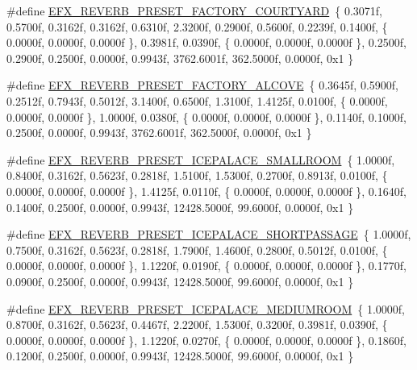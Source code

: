 \begin{DoxyCompactItemize}
\item 
\#define \hyperlink{efx-presets_8h_a687a7fe2f8084947684e61917343ac38}{E\+F\+X\+\_\+\+R\+E\+V\+E\+R\+B\+\_\+\+P\+R\+E\+S\+E\+T\+\_\+\+F\+A\+C\+T\+O\+R\+Y\+\_\+\+C\+O\+U\+R\+T\+Y\+A\+RD}~\{ 0.\+3071f, 0.\+5700f, 0.\+3162f, 0.\+3162f, 0.\+6310f, 2.\+3200f, 0.\+2900f, 0.\+5600f, 0.\+2239f, 0.\+1400f, \{ 0.\+0000f, 0.\+0000f, 0.\+0000f \}, 0.\+3981f, 0.\+0390f, \{ 0.\+0000f, 0.\+0000f, 0.\+0000f \}, 0.\+2500f, 0.\+2900f, 0.\+2500f, 0.\+0000f, 0.\+9943f, 3762.\+6001f, 362.\+5000f, 0.\+0000f, 0x1 \}
\item 
\#define \hyperlink{efx-presets_8h_a20efe3830ae7142d45be73af807e4d04}{E\+F\+X\+\_\+\+R\+E\+V\+E\+R\+B\+\_\+\+P\+R\+E\+S\+E\+T\+\_\+\+F\+A\+C\+T\+O\+R\+Y\+\_\+\+A\+L\+C\+O\+VE}~\{ 0.\+3645f, 0.\+5900f, 0.\+2512f, 0.\+7943f, 0.\+5012f, 3.\+1400f, 0.\+6500f, 1.\+3100f, 1.\+4125f, 0.\+0100f, \{ 0.\+0000f, 0.\+0000f, 0.\+0000f \}, 1.\+0000f, 0.\+0380f, \{ 0.\+0000f, 0.\+0000f, 0.\+0000f \}, 0.\+1140f, 0.\+1000f, 0.\+2500f, 0.\+0000f, 0.\+9943f, 3762.\+6001f, 362.\+5000f, 0.\+0000f, 0x1 \}
\item 
\#define \hyperlink{efx-presets_8h_a5873e650095207f32ba5618d48a17aa5}{E\+F\+X\+\_\+\+R\+E\+V\+E\+R\+B\+\_\+\+P\+R\+E\+S\+E\+T\+\_\+\+I\+C\+E\+P\+A\+L\+A\+C\+E\+\_\+\+S\+M\+A\+L\+L\+R\+O\+OM}~\{ 1.\+0000f, 0.\+8400f, 0.\+3162f, 0.\+5623f, 0.\+2818f, 1.\+5100f, 1.\+5300f, 0.\+2700f, 0.\+8913f, 0.\+0100f, \{ 0.\+0000f, 0.\+0000f, 0.\+0000f \}, 1.\+4125f, 0.\+0110f, \{ 0.\+0000f, 0.\+0000f, 0.\+0000f \}, 0.\+1640f, 0.\+1400f, 0.\+2500f, 0.\+0000f, 0.\+9943f, 12428.\+5000f, 99.\+6000f, 0.\+0000f, 0x1 \}
\item 
\#define \hyperlink{efx-presets_8h_afccf8f45a932907098c4847c336a97f5}{E\+F\+X\+\_\+\+R\+E\+V\+E\+R\+B\+\_\+\+P\+R\+E\+S\+E\+T\+\_\+\+I\+C\+E\+P\+A\+L\+A\+C\+E\+\_\+\+S\+H\+O\+R\+T\+P\+A\+S\+S\+A\+GE}~\{ 1.\+0000f, 0.\+7500f, 0.\+3162f, 0.\+5623f, 0.\+2818f, 1.\+7900f, 1.\+4600f, 0.\+2800f, 0.\+5012f, 0.\+0100f, \{ 0.\+0000f, 0.\+0000f, 0.\+0000f \}, 1.\+1220f, 0.\+0190f, \{ 0.\+0000f, 0.\+0000f, 0.\+0000f \}, 0.\+1770f, 0.\+0900f, 0.\+2500f, 0.\+0000f, 0.\+9943f, 12428.\+5000f, 99.\+6000f, 0.\+0000f, 0x1 \}
\item 
\#define \hyperlink{efx-presets_8h_adcfa8da52e8876bda4b3598de6434f01}{E\+F\+X\+\_\+\+R\+E\+V\+E\+R\+B\+\_\+\+P\+R\+E\+S\+E\+T\+\_\+\+I\+C\+E\+P\+A\+L\+A\+C\+E\+\_\+\+M\+E\+D\+I\+U\+M\+R\+O\+OM}~\{ 1.\+0000f, 0.\+8700f, 0.\+3162f, 0.\+5623f, 0.\+4467f, 2.\+2200f, 1.\+5300f, 0.\+3200f, 0.\+3981f, 0.\+0390f, \{ 0.\+0000f, 0.\+0000f, 0.\+0000f \}, 1.\+1220f, 0.\+0270f, \{ 0.\+0000f, 0.\+0000f, 0.\+0000f \}, 0.\+1860f, 0.\+1200f, 0.\+2500f, 0.\+0000f, 0.\+9943f, 12428.\+5000f, 99.\+6000f, 0.\+0000f, 0x1 \}

\end{DoxyCompactItemize}
